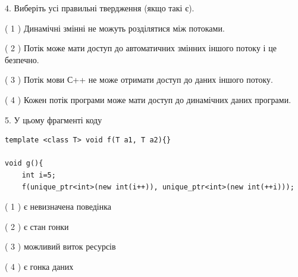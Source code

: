 \documentclass[12pt, ukrainian]{article}
\begin{document}
\begin {large}
{%
4. Виберіть усі правильні твердження (якщо такі є).\par
\vspace{2mm}

( 1 ) Динамічні змінні не можуть розділятися між потоками.%

( 2 ) Потік може мати доступ до автоматичних змінних іншого потоку і це безпечно.%

( 3 ) Потік мови С++ не може отримати доступ до даних іншого потоку.%

( 4 ) Кожен потік програми може мати доступ до динамічних даних програми.%


5. У цьому фрагменті коду
\begin{verbatim}
template <class T> void f(T a1, T a2){}

void g(){
    int i=5;
    f(unique_ptr<int>(new int(i++)), unique_ptr<int>(new int(++i)));
\end{verbatim}

( 1 ) є невизначена поведінка%

( 2 ) є стан гонки%

( 3 ) можливий виток ресурсів%

( 4 ) є гонка даних%
}
\end {large}
\end{document}
